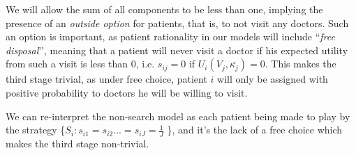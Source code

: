 \documentclass{article}
\begin{document}
We will allow the sum of all components to be less than one, implying the presence of an \textit{outside option} for patients, that is, to not visit any doctors. Such an option is important, as patient rationality in our models will include  ``\textit{free disposal}’’, meaning that a patient will never visit a doctor if his expected utility from such a visit is less than $0$, i.e. $s_{ij} = 0$ if $U_i(V_j,\bar{\kappa_j}) = 0$. This makes the third stage trivial, as under free choice, patient $i$ will only be assigned with positive probability to doctors he will be willing to visit.

We can re-interpret the non-search model as each patient being made to play by the strategy \{$S_i: s_{i1} = s_{i2} ... = s_{iJ} = \frac{1}{J}$ \}, and it’s the lack of a free choice which makes the third stage non-trivial.
\end{document}
